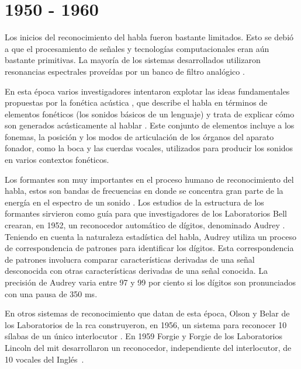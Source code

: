 \section{1950 - 1960}
\label{sec:50s}

Los inicios del reconocimiento del habla fueron bastante limitados. Esto se debi\'o a que el procesamiento 
de se\~{n}ales y tecnolog\'{i}as computacionales eran a\'un bastante primitivas. 
La mayor\'{i}a de los sistemas desarrollados utilizaron resonancias espectrales prove\'{i}das por 
un banco de filtro anal\'{o}gico \cite{Furui50Years2004}.
 
En esta \'{e}poca varios investigadores intentaron
explotar las ideas fundamentales propuestas por la fon\'{e}tica ac\'{u}stica \cite{AnusuyaSpeech2009}, que
describe el habla en t\'{e}rminos de elementos fon\'{e}ticos (los sonidos b\'{a}sicos de un lenguaje) y trata de
explicar c\'{o}mo son generados ac\'{u}sticamente al hablar \cite{JuangAutomaticSpeech}. 
Este conjunto de elementos incluye a los fonemas, la posici\'on y los modos de articulaci\'on de los \'organos
del aparato fonador, como la boca y las cuerdas vocales, utilizados para producir los sonidos 
en varios contextos fon\'{e}ticos.

Los formantes son muy importantes en el proceso humano de reconocimiento del habla, estos son bandas de frecuencias en 
donde se concentra gran parte de la energ\'{i}a en el espectro de un sonido \cite{HawkinsAcoustic2009}. Los estudios
de la estructura de los formantes sirvieron como gu\'{i}a para que investigadores de los Laboratorios Bell crearan,
en 1952, un reconocedor autom\'{a}tico de d\'{i}gitos, denominado Audrey \cite{DavisAutomatic1952}. 
Teniendo en cuenta la naturaleza estad\'{i}stica del habla, Audrey utiliza un proceso de correspondencia de patrones
para identificar los d\'{i}gitos. Esta correspondencia de patrones involucra comparar caracter\'{i}sticas derivadas
de una se\~{n}al desconocida con otras caracter\'{i}sticas derivadas de una se\~{n}al conocida. La precisi\'{o}n de
Audrey varia entre 97 y 99 por ciento si los d\'{i}gitos son pronunciados con una pausa de 350 ms.

En otros sistemas de reconocimiento que datan de esta \'{e}poca, Olson y Belar de los Laboratorios 
de la \gls{rca} construyeron, en 1956, un sistema para reconocer 10 s\'{i}labas de un \'{u}nico 
interlocutor \cite{OlsonPhonetic1956}. En 1959 Forgie y Forgie de los Laboratorios Lincoln del \gls{mit} 
desarrollaron un reconocedor, independiente del interlocutor, de 10 vocales del 
\mbox{Ingl\'{e}s \cite{ForgieResults1959}}.
